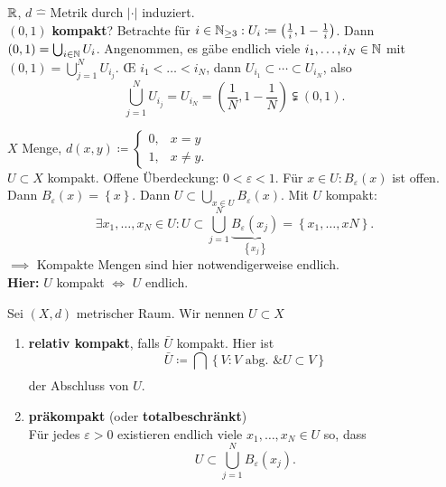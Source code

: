 \begin{subexample}
	$ \mathbb{R}  $, $ d $  $\widehat{-}  $ Metrik durch $ \left| \cdot  \right|  $ induziert.\\
	$ (0, 1) $ \textbf{kompakt}?
	Betrachte für $ i \in \mathbb{N} _{\geq 3} : U_i \coloneqq \left(\frac{ 1 }{ i } , 1 - \frac{ 1 }{ i } \right) $.
	Dann $ (0, 1) = \bigcup_{i \in \mathbb{N} } U_i $. Angenommen, es gäbe endlich viele $ i_1, \dotsc, i_N \in \mathbb{N} $ mit $ (0, 1) = \bigcup_{j = 1} ^N U_{i_j}  $.
	\OE{} $ i_1 < \dotsc < i_N $, dann $ U_{i_1} \subset \dotsb \subset U_{i_N}  $, also
	\[ 
		\bigcup_{j = 1} ^N U_{i_j} = U_{i_N} = \left( \frac{ 1 }{ N } , 1 - \frac{ 1 }{ N }  \right) \subsetneqq (0, 1) .
	\]
\end{subexample}

\begin{subexample}
	$ X $ Menge, $ d(x, y) \coloneqq \begin{cases}
		0, & x = y\\ 1, & x \neq y.
	\end{cases} $\\
	$ U \subset X $ kompakt. Offene Überdeckung: $ 0 < \varepsilon < 1 $. Für $ x \in U: B_{\varepsilon}(x)  $ ist offen. Dann $ B_{\varepsilon}(x)  = \left\{ x \right\} $.
	Dann $ U \subset \bigcup_{x \in U} B_{\varepsilon}(x)  $. Mit $ U $ kompakt:
	\[ \exists x_1, \dotsc, x_N \in U : U \subset \bigcup_{j = 1} ^N \underbrace{B_{\varepsilon}(x_j) }_{\left\{ x_j \right\} } = \left\{ x_1, \dotsc, xN \right\}  .\]
	$ \implies  $ Kompakte Mengen sind hier notwendigerweise endlich.\\
	\textbf{Hier:} $ U $ kompakt $ \iff  $ $ U $ endlich.
\end{subexample}

\begin{subdefinition}
	Sei $ (X, d) $ metrischer Raum.
	Wir nennen $ U \subset X $ 
	\begin{enumerate}[label=(\roman*)]
		\item \textbf{relativ kompakt}, falls $ \bar{U}  $ kompakt.
			Hier ist
			\[
				\bar{U} \coloneqq \bigcap_{} \left\{ V: V \text{ abg. } \& U \subset V \right\} 
			\]
			der Abschluss von $ U $.
		\item \textbf{präkompakt} (oder \textbf{totalbeschränkt})\\
			Für jedes $ \varepsilon > 0 $ existieren endlich viele $ x_1, \dotsc, x_N \in U $ so, dass 
			\[
				U \subset \bigcup_{j = 1} ^N B_{\varepsilon}(x_j) .
			\]
	\end{enumerate}
	
\end{subdefinition}

